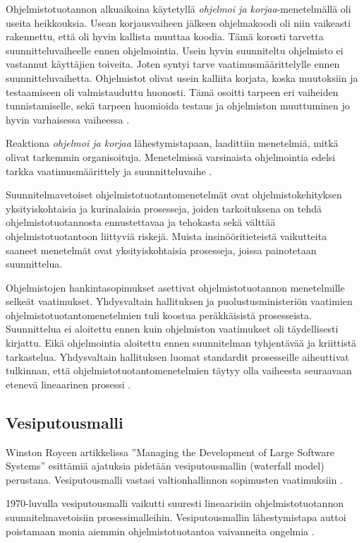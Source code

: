 \documentclass[finnish]{tktltiki2}
\theoremstyle{definition}
\theoremstyle{remark}
\begin{document}
Ohjelmistotuotannon alkuaikoina käytetyllä \textit{ohjelmoi ja korjaa}-menetelmällä oli useita heikkouksia. Usean korjausvaiheen jälkeen ohjelmakoodi oli niin vaikeasti rakennettu, että oli hyvin kallista muuttaa koodia. Tämä korosti tarvetta suunnitteluvaiheelle ennen ohjelmointia. Usein hyvin suunniteltu ohjelmisto ei vastannut käyttäjien toiveita. Joten syntyi tarve vaatimusmäärittelylle ennen suunnitteluvaihetta. Ohjelmistot olivat usein kalliita korjata, koska muutoksiin ja testaamiseen oli valmistauduttu huonosti. Tämä osoitti tarpeen eri vaiheiden tunnistamiselle, sekä tarpeen huomioida testaus ja ohjelmiston muuttuminen jo hyvin varhaisessa vaiheessa \cite{BOE88}.

Reaktiona \textit{ohjelmoi ja korjaa} lähestymistapaan, laadittiin menetelmiä, mitkä olivat tarkemmin organisoituja. Menetelmissä varsinaista ohjelmointia edelsi tarkka vaatimusmäärittely ja suunnitteluvaihe \cite{BOE06}.

Suunnitelmavetoiset ohjelmistotuotantomenetelmät ovat ohjelmistokehityksen yksityiskohtaisia ja kurinalaisia prosesseja, joiden tarkoituksena on tehdä ohjelmistotuotannosta ennustettavaa ja tehokasta sekä välttää ohjelmistotuotantoon liittyviä riskejä. Muista insinööritieteistä vaikutteita saaneet menetelmät ovat yksityiskohtaisia prosesseja, joissa painotetaan suunnittelua\cite{FOW01a}.

Ohjelmistojen hankintasopimukset asettivat ohjelmistotuotannon menetelmille selkeät vaatimukset. Yhdysvaltain hallituksen ja puolustusministeriön vaatimien ohjelmistotuotantomenetelmien tuli koostua peräkkäisistä prosesseista. Suunnittelua ei aloitettu ennen kuin ohjelmiston vaatimukset oli täydellisesti kirjattu. Eikä ohjelmointia aloitettu ennen suunnitelman tyhjentävää ja kriittistä tarkastelua. Yhdysvaltain hallituksen luomat standardit prosesseille aiheuttivat tulkinnan, että ohjelmistotuotantomenetelmien täytyy olla vaiheesta seuraavaan etenevä lineaarinen prosessi \cite{BOE06}.

\subsection{Vesiputousmalli}

Winston Roycen artikkelissa ''Managing the Development of Large Software Systems'' esittämiä ajatuksia pidetään vesiputousmallin (waterfall model) perustana. Vesiputousmalli vastasi valtionhallinnon sopimusten vaatimuksiin \cite{LAB03}.

1970-luvulla vesiputousmalli vaikutti suuresti lineaarisiin ohjelmistotuotannon suunnitelmavetoisiin prosessimalleihin. Vesiputousmallin lähestymistapa auttoi poistamaan monia aiemmin ohjelmistotuotantoa vaivanneita ongelmia \cite{BOE88}.
\end{document}
